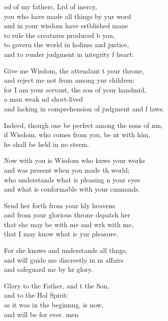 \settowidth{\versewidth}{Indeed, though one be perfect among the sons of men, +}
\begin{psalmverse}%
  \begin{patverse}
od of my fathers, Lrd of mercy,\Med\\
you who have made all things by yur word\\
and in your wisdom have estblished mane\Med\\
to rule the creatures produced b you,\\
to govern the world in holinss and justice,\Med\\
and to render judgment in integrity f heart:

Give me Wisdom, the attendant t your throne,\Med\\
and reject me not from among yur children:\\
for I am your servant, the son of your handmid,\Flex\\
a man weak nd short-lived\Med\\
and lacking in comprehension of judgment and f laws.

Indeed, though one be perfect among the sons of mn,\Flex\\
if Wisdom, who comes from you, be nt with him,\Med\\
he shall be held in no steem.

Now with you is Wisdom who knws your works\Med\\
and was present when you made th world;\\
who understands what is pleasing \pointup{\i}n your eyes\Med\\
and what is conformable with your cmmands.

Send her forth from your hly heavens\Med\\
and from your glorious throne d\pointup{\i}spatch her\\
that she may be with me and wrk with me,\Med\\
that I may know what is yur pleasure.

For she knows and understands all th\pointup{\i}ngs,\Flex\\
and will guide me discreetly in m affairs\Med\\
and safeguard me by hr glory.

Glory to the Father, and t the Son,\Med\\
and to the Hol Spirit:\\
as it was in the beginn\pointup{\i}ng, is now,\Med\\
and will be for ever. men
  \end{patverse}
\end{psalmverse}

